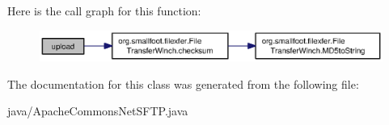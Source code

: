 Here is the call graph for this function\-:\nopagebreak
\begin{figure}[H]
\begin{center}
\leavevmode
\includegraphics[width=350pt]{classorg_1_1smallfoot_1_1filexfer_1_1ApacheCommonsNetSFTP_afa3dfccec4b989cafc56103eb1ee82a6_cgraph}
\end{center}
\end{figure}




The documentation for this class was generated from the following file\-:\begin{DoxyCompactItemize}
\item 
java/Apache\-Commons\-Net\-S\-F\-T\-P.\-java\end{DoxyCompactItemize}
